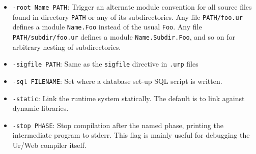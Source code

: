 \documentclass{article}
\newcommand{\cd}[1]{\texttt{#1}}
\begin{document}
\begin{itemize}
\begin{itemize}
    Also see the discussion of the \cd{prefix} directive for CGI above; similar configuration is likely to be necessary for FastCGI.  An Ur/Web application won't generally run correctly if it doesn't have a unique URI prefix assigned to it and configured with \cd{prefix}.

    Here is some lighttpd configuration for the same application.
    \begin{verbatim}
fastcgi.server = (
  "/Hello/" =>
  (( "bin-path" => "/path/to/hello.exe",
  "socket" => "/tmp/hello",
  "check-local" => "disable",
  "docroot" => "/",
  "max-procs" => "1"
  ))
)
    \end{verbatim}
    The least obvious requirement is setting \texttt{max-procs} to 1, so that lighttpd doesn't try to multiplex requests across multiple external processes.  This is required for message-passing applications, where a single database of client connections is maintained within a multi-threaded server process.  Multiple processes may, however, be used safely with applications that don't use message-passing.

    A FastCGI process reads the environment variable \texttt{URWEB\_NUM\_THREADS} to determine how many threads to spawn for handling client requests.  The default is 1.

  \item \texttt{static}: This protocol may be used to generate static web pages from Ur/Web code.  The output executable expects a single command-line argument, giving the URI of a page to generate.  For instance, this argument might be \cd{/main}, in which case a static HTTP response for that page will be written to stdout.
  \end{itemize}

\item \texttt{-root Name PATH}: Trigger an alternate module convention for all source files found in directory \texttt{PATH} or any of its subdirectories.  Any file \texttt{PATH/foo.ur} defines a module \texttt{Name.Foo} instead of the usual \texttt{Foo}.  Any file \texttt{PATH/subdir/foo.ur} defines a module \texttt{Name.Subdir.Foo}, and so on for arbitrary nesting of subdirectories.

\item \texttt{-sigfile PATH}: Same as the \texttt{sigfile} directive in \texttt{.urp} files

\item \texttt{-sql FILENAME}: Set where a database set-up SQL script is written.

\item \texttt{-static}: Link the runtime system statically.  The default is to link against dynamic libraries.

\item \texttt{-stop PHASE}: Stop compilation after the named phase, printing the intermediate program to stderr.  This flag is mainly useful for debugging the Ur/Web compiler itself.
\end{itemize}
\end{document}
